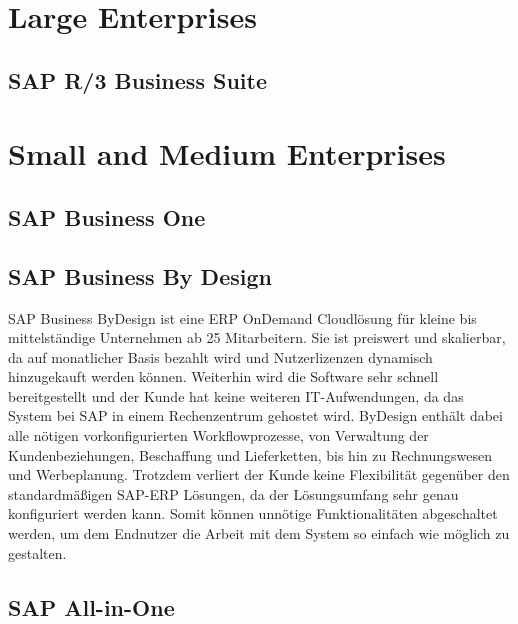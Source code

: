 \section{Large Enterprises}
\subsection{SAP R/3 Business Suite}
\label{sec:business-suite}

\section{Small and Medium Enterprises}
\subsection{SAP Business One}
\label{sec:business-one}

\subsection{SAP Business By Design}
\label{sec:byd}

SAP Business ByDesign ist eine ERP OnDemand Cloudlösung für kleine bis mittelständige Unternehmen ab 25 Mitarbeitern. Sie ist preiswert und skalierbar, da auf monatlicher Basis bezahlt wird und Nutzerlizenzen dynamisch hinzugekauft werden können. Weiterhin wird die Software sehr schnell bereitgestellt und der Kunde hat keine weiteren IT-Aufwendungen, da das System bei SAP in einem Rechenzentrum gehostet wird. ByDesign enthält dabei alle nötigen vorkonfigurierten Workflowprozesse, von Verwaltung der Kundenbeziehungen, Beschaffung und Lieferketten, bis hin zu Rechnungswesen und Werbeplanung. Trotzdem verliert der Kunde keine Flexibilität gegenüber den standardmäßigen SAP-ERP Lösungen, da der Lösungsumfang sehr genau konfiguriert werden kann. Somit können unnötige Funktionalitäten abgeschaltet werden, um dem Endnutzer die Arbeit mit dem System so einfach wie möglich zu gestalten.

\subsection{SAP All-in-One}
\label{sec:allinone}

